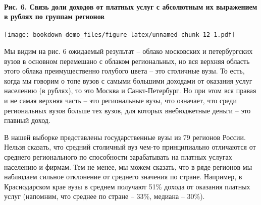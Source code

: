 \documentclass[]{book}
\let\oldparagraph\paragraph
\renewcommand{\paragraph}[1]{\oldparagraph{#1}\mbox{}}
\begin{document}
\hypertarget{ux440ux438ux441.-6.-ux441ux432ux44fux437ux44c-ux434ux43eux43bux438-ux434ux43eux445ux43eux434ux43eux432-ux43eux442-ux43fux43bux430ux442ux43dux44bux445-ux443ux441ux43bux443ux433-ux441-ux430ux431ux441ux43eux43bux44eux442ux43dux44bux43c-ux438ux445-ux432ux44bux440ux430ux436ux435ux43dux438ux435ux43c-ux432-ux440ux443ux431ux43bux44fux445-ux43fux43e-ux433ux440ux443ux43fux43fux430ux43c-ux440ux435ux433ux438ux43eux43dux43eux432}{%
\paragraph{Рис. 6. Связь доли доходов от платных услуг с абсолютным их выражением в рублях по группам регионов}\label{ux440ux438ux441.-6.-ux441ux432ux44fux437ux44c-ux434ux43eux43bux438-ux434ux43eux445ux43eux434ux43eux432-ux43eux442-ux43fux43bux430ux442ux43dux44bux445-ux443ux441ux43bux443ux433-ux441-ux430ux431ux441ux43eux43bux44eux442ux43dux44bux43c-ux438ux445-ux432ux44bux440ux430ux436ux435ux43dux438ux435ux43c-ux432-ux440ux443ux431ux43bux44fux445-ux43fux43e-ux433ux440ux443ux43fux43fux430ux43c-ux440ux435ux433ux438ux43eux43dux43eux432}}

\texttt{[image: bookdown-demo\_files/figure-latex/unnamed-chunk-12-1.pdf]}

Мы видим на рис. 6 ожидаемый результат -- облако московских и петербургских вузов в основном перемешано с облаком региональных, но вся верхняя область этого облака преимущественно голубого цвета -- это столичные вузы. То есть, когда мы говорим о топе вузов с самыми большими доходами от оказания услуг населению (в рублях), то это Москва и Санкт-Петербург. Но при этом вся правая и не самая верхняя часть -- это региональные вузы, что означает, что среди региональных вузов больше тех вузов, для которых внебюджетные деньги -- это главный доход.

В нашей выборке представлены государственные вузы из 79 регионов России. Нельзя сказать, что средний столичный вуз чем-то принципиально отличаются от среднего регионального по способности зарабатывать на платных услугах населению и фирмам. Тем не менее, мы можем сказать, что в ряде регионов мы наблюдаем сильное отклонение от среднего значения по стране. Например, в Краснодарском крае вузы в среднем получают 51\% дохода от оказания платных услуг (напомним, что среднее по стране -- 33\%, медиана -- 30\%).
\end{document}
